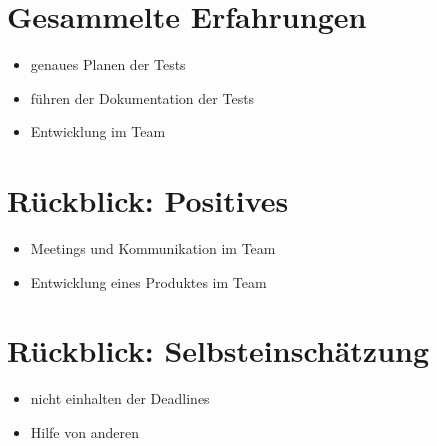 \documentclass[ignorenonframetext, 11pt, table]{beamer}
\begin{document}
\section*{Gesammelte Erfahrungen}
\begin{frame}
\begin{itemize}
	\item genaues Planen der Tests
	\item führen der Dokumentation der Tests
	\item Entwicklung im Team
\end{itemize}
\end{frame}

\section*{Rückblick: Positives}
\begin{frame}
\begin{itemize}
	\item Meetings und Kommunikation im Team
	\item Entwicklung eines Produktes im Team
\end{itemize}
\end{frame}

\section*{Rückblick: Selbsteinschätzung}
\begin{frame}
\begin{itemize}
	\item nicht einhalten der Deadlines
	\item Hilfe von anderen
\end{itemize}
\end{frame}
\end{document}
